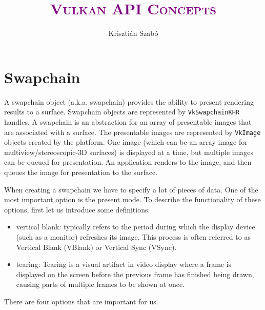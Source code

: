 \documentclass[12pt]{article}
\title{\textcolor{purple}{\Huge\textbf{\textsc{Vulkan API Concepts}}}}
\author{Krisztián Szabó}
\begin{document}
	
	\maketitle
	\tableofcontents
	\newpage
	
	\section{Swapchain}
	
	A swapchain object (a.k.a. swapchain) provides the ability to present rendering results to a surface. Swapchain objects are represented by \texttt{VkSwapchainKHR} handles. A swapchain is an abstraction for an array of presentable images that are associated with a surface. The presentable images are represented by \texttt{VkImage} objects created by the platform. One image (which can be an array image for multiview/stereoscopic-3D surfaces) is displayed at a time, but multiple images can be queued for presentation. An application renders to the image, and then queues the image for presentation to the surface.\newline
	
	When creating a swapchain we have to specify a lot of pieces of data. One of the most important option is the present mode. To describe the functionality of these options, first let us introduce some definitions.
	
	\begin{itemize}
		\item vertical blank: typically refers to the period during which the display device (such as a monitor) refreshes its image. This process is often referred to as Vertical Blank (VBlank) or Vertical Sync (VSync).
		\item tearing: Tearing is a visual artifact in video display where a frame is displayed on the screen before the previous frame has finished being drawn, causing parts of multiple frames to be shown at once.
	\end{itemize}
	
	There are four options that are important for us.
	
\end{document}
